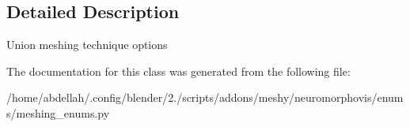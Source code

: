 \subsection{Detailed Description}


\begin{DoxyVerb}Union meshing technique options
\end{DoxyVerb}
 

The documentation for this class was generated from the following file\+:\begin{DoxyCompactItemize}
\item 
/home/abdellah/.\+config/blender/2./scripts/addons/meshy/neuromorphovis/enums/meshing\+\_\+enums.\+py\end{DoxyCompactItemize}
